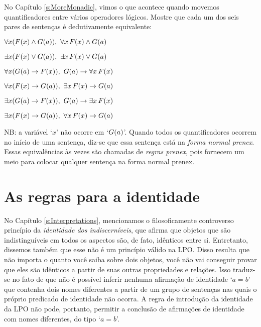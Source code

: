 \problempart
No Capítulo \ref{s:MoreMonadic}, vimos o que acontece quando movemos quantificadores entre  vários operadores lógicos. Mostre que cada um dos seis pares de sentenças é dedutivamente equivalente:
\begin{earg}
\item $\forall x(\mathord{F}(x) \wedge \mathord{G}(a)),\,\,  \forall x\,\mathord{F}(x) \wedge \mathord{G}(a)$
\item $\exists x(\mathord{F}(x) \vee \mathord{G}(a)),\,\,  \exists x\,\mathord{F}(x) \vee \mathord{G}(a)$
\item $\forall x(\mathord{G}(a) \rightarrow \mathord{F}(x)),\,\,  \mathord{G}(a) \rightarrow \forall x\,\mathord{F}(x)$
\item $\forall x(\mathord{F}(x) \rightarrow \mathord{G}(a)),\,\,  \exists x\,\mathord{F}(x) \rightarrow \mathord{G}(a)$
\item $\exists x(\mathord{G}(a) \rightarrow \mathord{F}(x)),\,\,  \mathord{G}(a) \rightarrow \exists x\,\mathord{F}(x)$
\item $\exists x(\mathord{F}(x) \rightarrow \mathord{G}(a)),\,\,  \forall x\,\mathord{F}(x) \rightarrow \mathord{G}(a)$
\end{earg}
NB: a variável `$x$' não ocorre em `$\mathord{G}(a)$'. Quando todos os quantificadores ocorrem no início de uma sentença, diz-se que essa sentença está na \emph{forma normal prenex}. Essas equivalências às vezes são chamadas de \emph{regras prenex}, pois fornecem um meio para colocar qualquer sentença na forma normal prenex.


 

\chapter{As regras para a identidade}

No Capítulo  \ref{s:Interpretations}, mencionamos o filosoficamente controverso   princípio da \emph{identidade dos indiscerníveis}, que afirma que objetos que são indistinguíveis em todos os aspectos são, de fato, idênticos entre si. Entretanto, dissemos também que esse não é um princípio válido na LPO.  Disso resulta que não importa o quanto você saiba sobre dois objetos, você não vai conseguir provar que eles são idênticos a partir de suas outras propriedades e relações. Isso traduz-se no fato de que não é possível inferir nenhuma afirmação de identidade `$a=b$' que contenha dois nomes diferentes a partir de um grupo de sentenças nas quais o próprio predicado de identidade não ocorra. A regra de introdução da identidade da LPO não pode, portanto, permitir a conclusão de afirmações de identidade com nomes diferentes, do tipo `$a=b$'.


